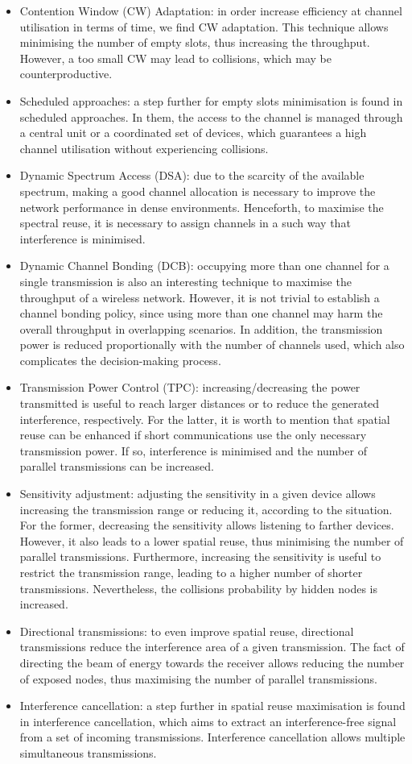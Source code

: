 \documentclass[12pt, a4paper,twoside]{tesi_upf}
\begin{document}
			\begin{itemize}
				\item Contention Window (CW) Adaptation: in order increase efficiency at channel utilisation in terms of time, we find CW adaptation. This technique allows minimising the number of empty slots, thus increasing the throughput. However, a too small CW may lead to collisions, which may be counterproductive.
				\item Scheduled approaches: a step further for empty slots minimisation is found in scheduled approaches. In them, the access to the channel is managed through a central unit or a coordinated set of devices, which guarantees a high channel utilisation without experiencing collisions. 
				\item Dynamic Spectrum Access (DSA): due to the scarcity of the available spectrum, making a good channel allocation is necessary to improve the network performance in dense environments. Henceforth, to maximise the spectral reuse, it is necessary to assign channels in a such way that interference is minimised.
				\item Dynamic Channel Bonding (DCB): occupying more than one channel for a single transmission is also an interesting technique to maximise the throughput of a wireless network. However, it is not trivial to establish a channel bonding policy, since using more than one channel may harm the overall throughput in overlapping scenarios. In addition, the transmission power is reduced proportionally with the number of channels used, which also complicates the decision-making process.
				\item Transmission Power Control (TPC): increasing/decreasing the power transmitted is useful to reach larger distances or to reduce the generated interference, respectively. For the latter, it is worth to mention that spatial reuse can be enhanced if short communications use the only necessary transmission power. If so, interference is minimised and the number of parallel transmissions can be increased.
				\item Sensitivity adjustment: adjusting the sensitivity in a given device allows increasing the transmission range or reducing it, according to the situation. For the former, decreasing the sensitivity allows listening to farther devices. However, it also leads to a lower spatial reuse, thus minimising the number of parallel transmissions. Furthermore, increasing the sensitivity is useful to restrict the transmission range, leading to a higher number of shorter transmissions. Nevertheless, the collisions probability by hidden nodes is increased.
				\item Directional transmissions: to even improve spatial reuse, directional transmissions reduce the interference area of a given transmission. The fact of directing the beam of energy towards the receiver allows reducing the number of exposed nodes, thus maximising the number of parallel transmissions.
				\item Interference cancellation: a step further in spatial reuse maximisation is found in interference cancellation, which aims to extract an interference-free signal from a set of incoming transmissions. Interference cancellation allows multiple simultaneous transmissions.
			\end{itemize}
\end{document}

